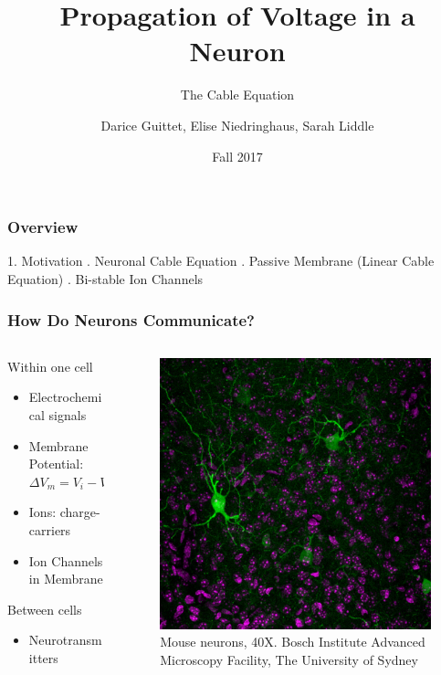 \documentclass{beamer}
\title{Propagation of Voltage in a Neuron}
\subtitle{The Cable Equation}
\author{Darice Guittet, Elise Niedringhaus, Sarah Liddle}
\date{Fall 2017}
\begin{document}
 
\frame{\titlepage}
 
\begin{frame}
\frametitle{Overview}
1. Motivation \newline {}. Neuronal Cable Equation \newline {}. Passive Membrane (Linear Cable Equation) \newline {}. Bi-stable Ion Channels
\end{frame}

\begin{frame}
\frametitle{How Do Neurons Communicate?}
\begin{columns}
    \begin{column}{.5\textwidth}
    Within one cell
    \begin{itemize}
	\item Electrochemical signals
	\item Membrane Potential: $\Delta V_m = V_i - V_e$
	\item Ions: charge-carriers
	\item Ion Channels in Membrane \newline
	\end{itemize}
	Between cells
	\begin{itemize}
	\item Neurotransmitters
\end{itemize}
    \end{column}
    
    \begin{column}{.5\textwidth}
    \begin{figure}[H]\label{neuron}
    \includegraphics[width=\textwidth]{OConnor-InhibitoryInterneurons1}
	\caption{Mouse neurons, 40X. Bosch Institute Advanced Microscopy Facility, The University of Sydney}
    \end{figure}
    

\end{column}
\end{columns}
\end{frame}
\end{document}
